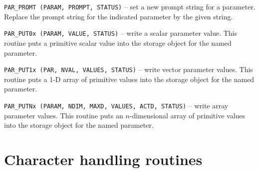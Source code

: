 \begin{description}
\item{\tt PAR\_PROMT (PARAM, PROMPT, STATUS)}
-- set a new prompt string for a parameter.
Replace the prompt string for the indicated parameter by the
given string.


\item{\tt PAR\_PUT0x (PARAM, VALUE, STATUS)}
-- write a scalar parameter value.
This routine puts a primitive scalar value into the storage object
for the named parameter.



\item{\tt PAR\_PUT1x (PAR, NVAL, VALUES, STATUS)}
-- write vector parameter values.
This routine puts a 1-D array of primitive values into the storage
object for the named parameter.


\item{\tt PAR\_PUTNx (PARAM, NDIM, MAXD, VALUES, ACTD, STATUS)}
-- write array parameter values.
This routine puts an $n$-dimensional array of primitive values into 
the storage object
for the named parameter.

\end{description}

\newpage
\section{Character handling routines\label{apxchar}}

